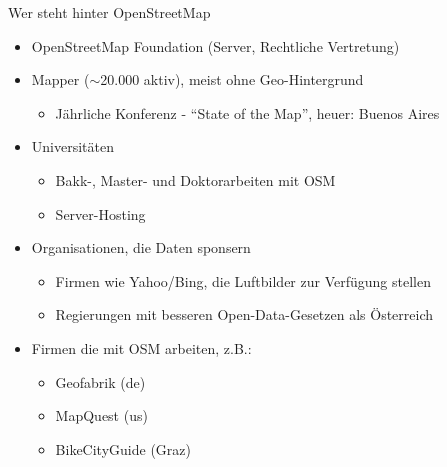 \documentclass[handout]{beamer}
\begin{document}
\begin{frame}{Wer steht hinter OpenStreetMap}

  \begin{itemize}
    \item OpenStreetMap Foundation (Server, Rechtliche Vertretung)
      \pause
    \item Mapper ($\sim$20.000 aktiv), meist ohne Geo-Hintergrund
    \begin{itemize}
      \item Jährliche Konferenz - "`State of the Map"', heuer: Buenos Aires
    \end{itemize}
      \pause
    \item Universitäten
    \begin{itemize}
      \item Bakk-, Master- und Doktorarbeiten mit OSM
      \item Server-Hosting
    \end{itemize}
      \pause
    \item Organisationen, die Daten sponsern
    \begin{itemize}
      \item Firmen wie Yahoo/Bing, die Luftbilder zur Verfügung stellen
      \item Regierungen mit besseren Open-Data-Gesetzen als Österreich
    \end{itemize}
      \pause
    \item Firmen die mit OSM arbeiten, z.B.:
    \begin{itemize}
      \item Geofabrik (de)
      \item MapQuest (us)
      \item BikeCityGuide (Graz)
    \end{itemize}
  \end{itemize}



\end{frame}
\end{document}
